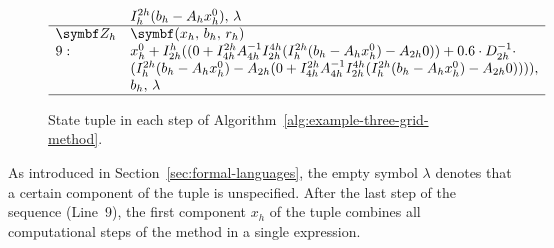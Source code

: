 \begin{figure}
\begin{equation*}
\begin{array}{l l}
			& I_{h}^{2h}(b_{h} - A_h x_{h}^0), \, \lambda \\ \hline 
			\bm{Z_h} & \bm{(x_h, \, b_h, \, r_h)}  \\
			9: & x_{h}^0 + I_{2h}^h ((0 + I_{4h}^{2h} A_{4h}^{-1} I_{2h}^{4h} (I_{h}^{2h}(b_{h} - A_h x_{h}^0) - A_{2h} 0)) + 0.6 \cdot D_{2h}^{-1} \cdot \\ 
			& (I_{h}^{2h}(b_{h} - A_h x_{h}^0) - A_{2h} (0 + I_{4h}^{2h} A_{4h}^{-1} I_{2h}^{4h} (I_{h}^{2h}(b_{h} - A_h x_{h}^0) - A_{2h} 0)))), \\ 
			&  b_h, \, \lambda \\
			\hline
		\end{array}
	\end{equation*}
	\caption{State tuple in each step of Algorithm~\ref{alg:example-three-grid-method}.}
	\label{fig:example-tree-grid-method-states}
\end{figure}
As introduced in Section~\ref{sec:formal-languages}, the empty symbol $\lambda$ denotes that a certain component of the tuple is unspecified.
After the last step of the sequence (Line~9), the first component $x_h$ of the tuple combines all computational steps of the method in a single expression.

